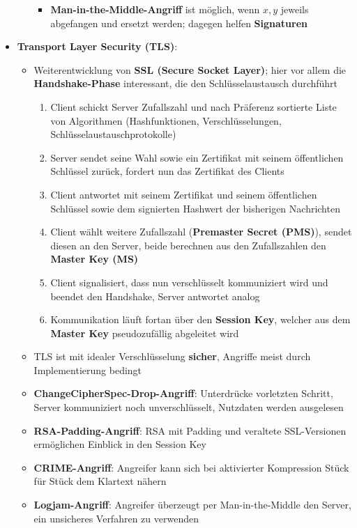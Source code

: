 \begin{itemize}
\begin{itemize}
\begin{itemize}
			\item \textbf{Man-in-the-Middle-Angriff} ist möglich, wenn $x, y$ jeweils abgefangen und ersetzt werden; dagegen helfen \textbf{Signaturen}
		\end{itemize}
	\end{itemize}
	\item \textbf{Transport Layer Security (TLS)}:
	\begin{itemize}
		\item Weiterentwicklung von \textbf{SSL (Secure Socket Layer)}; hier vor allem die \textbf{Handshake-Phase} interessant, die den Schlüsselaustausch durchführt
		\begin{enumerate}
			\item Client schickt Server Zufallszahl und nach Präferenz sortierte Liste von Algorithmen (Hashfunktionen, Verschlüsselungen, Schlüsselaustauschprotokolle)
			\item Server sendet seine Wahl sowie ein Zertifikat mit seinem öffentlichen Schlüssel zurück, fordert nun das Zertifikat des Clients
			\item Client antwortet mit seinem Zertifikat und seinem öffentlichen Schlüssel sowie dem signierten Hashwert der bisherigen Nachrichten
			\item Client wählt weitere Zufallszahl (\textbf{Premaster Secret (PMS)}), sendet diesen an den Server, beide berechnen aus den Zufallszahlen den \textbf{Master Key (MS)}
			\item Client signalisiert, dass nun verschlüsselt kommuniziert wird und beendet den Handshake, Server antwortet analog
			\item Kommunikation läuft fortan über den \textbf{Session Key}, welcher aus dem \textbf{Master Key} pseudozufällig abgeleitet wird
		\end{enumerate}
		\item TLS ist mit idealer Verschlüsselung \textbf{sicher}, Angriffe meist durch Implementierung bedingt
		\item \textbf{ChangeCipherSpec-Drop-Angriff}: Unterdrücke vorletzten Schritt, Server kommuniziert noch unverschlüsselt, Nutzdaten werden ausgelesen
		\item \textbf{RSA-Padding-Angriff}: RSA mit  Padding und veraltete SSL-Versionen ermöglichen Einblick in den Session Key
		\item \textbf{CRIME-Angriff}: Angreifer kann sich bei aktivierter Kompression Stück für Stück dem Klartext nähern
		\item \textbf{Logjam-Angriff}: Angreifer überzeugt per Man-in-the-Middle den Server, ein unsicheres Verfahren zu verwenden

\end{itemize}
\end{itemize}

